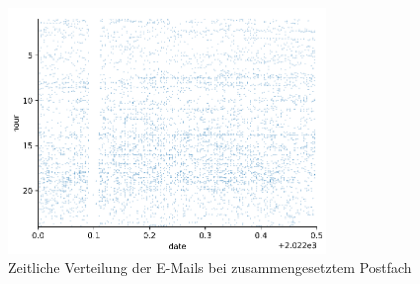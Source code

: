 \begin{figure}
    \centering
    \includegraphics[width=0.75\textwidth]{images/merged_plot.PNG}
    \caption{Zeitliche Verteilung der E-Mails bei zusammengesetztem Postfach} 
    \label{fig:auswertungzeitlichmerged}
\end{figure}